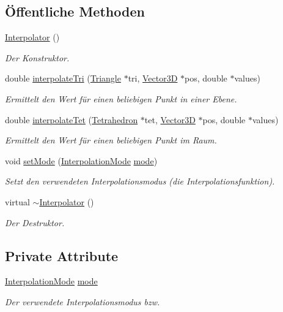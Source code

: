 \subsection*{Öffentliche Methoden}
\begin{DoxyCompactItemize}
\item 
\hyperlink{classInterpolator_ab8cbb0b13436fc54a4bba03804ae8f8a}{Interpolator} ()
\begin{DoxyCompactList}\small\item\em Der Konstruktor. \end{DoxyCompactList}\item 
double \hyperlink{classInterpolator_ad59ac6ed3822e08a67ac7d1ee88a5bd2}{interpolate\-Tri} (\hyperlink{classTriangle}{Triangle} $\ast$tri, \hyperlink{classVector3D}{Vector3\-D} $\ast$pos, double $\ast$values)
\begin{DoxyCompactList}\small\item\em Ermittelt den Wert für einen beliebigen Punkt in einer Ebene. \end{DoxyCompactList}\item 
double \hyperlink{classInterpolator_a30e714ca6dff9b5745d029f95af1420a}{interpolate\-Tet} (\hyperlink{classTetrahedron}{Tetrahedron} $\ast$tet, \hyperlink{classVector3D}{Vector3\-D} $\ast$pos, double $\ast$values)
\begin{DoxyCompactList}\small\item\em Ermittelt den Wert für einen beliebigen Punkt im Raum. \end{DoxyCompactList}\item 
void \hyperlink{classInterpolator_a2f9927fc580de7d2f94d85e6ca3ee3e3}{set\-Mode} (\hyperlink{classInterpolator_adb733b1439a2903feae57fa734ced0c2}{Interpolation\-Mode} \hyperlink{classInterpolator_ace34e7696bdf4a1f0544b145efee898e}{mode})
\begin{DoxyCompactList}\small\item\em Setzt den verwendeten Interpolationsmodus (die Interpolationsfunktion). \end{DoxyCompactList}\item 
virtual \hyperlink{classInterpolator_a6bb406dfe33e06296ccf24f18abcd46c}{$\sim$\-Interpolator} ()
\begin{DoxyCompactList}\small\item\em Der Destruktor. \end{DoxyCompactList}\end{DoxyCompactItemize}
\subsection*{Private Attribute}
\begin{DoxyCompactItemize}
\item 
\hyperlink{classInterpolator_adb733b1439a2903feae57fa734ced0c2}{Interpolation\-Mode} \hyperlink{classInterpolator_ace34e7696bdf4a1f0544b145efee898e}{mode}
\begin{DoxyCompactList}\small\item\em Der verwendete Interpolationsmodus bzw. \end{DoxyCompactList}\end{DoxyCompactItemize}


